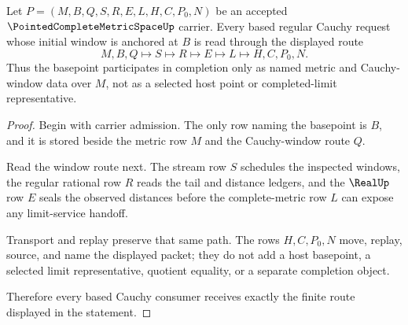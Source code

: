 \begin{theorem}
\label{thm:pointed-complete-metric-space-cauchy-basepoint-route}
Let $P=(M,B,Q,S,R,E,L,H,C,P_0,N)$ be an accepted
$\PointedCompleteMetricSpaceUp$ carrier. Every based regular Cauchy request
whose initial window is anchored at $B$ is read through the displayed route
$$
M,B,Q \longmapsto S \longmapsto R \longmapsto E \longmapsto L
\longmapsto H,C,P_0,N .
$$
Thus the basepoint participates in completion only as named metric and
Cauchy-window data over $M$, not as a selected host point or completed-limit
representative.
\end{theorem}
\begin{proof}
Begin with carrier admission. The only row naming the basepoint is $B$, and it
is stored beside the metric row $M$ and the Cauchy-window route $Q$.

Read the window route next. The stream row $S$ schedules the inspected windows,
the regular rational row $R$ reads the tail and distance ledgers, and the
$\RealUp$ row $E$ seals the observed distances before the complete-metric row
$L$ can expose any limit-service handoff.

Transport and replay preserve that same path. The rows $H,C,P_0,N$ move,
replay, source, and name the displayed packet; they do not add a host
basepoint, a selected limit representative, quotient equality, or a separate
completion object.

Therefore every based Cauchy consumer receives exactly the finite route
displayed in the statement.
\end{proof}

